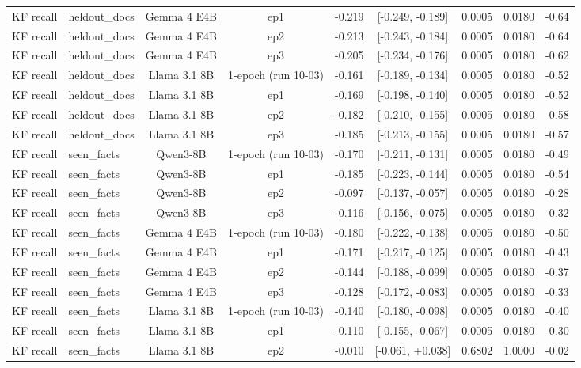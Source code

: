 \begin{table}[t]
{\begin{tabular}{llccccccc}
KF recall & heldout\_docs & Gemma 4 E4B & ep1 & -0.219 & [-0.249, -0.189] & 0.0005 & 0.0180 & -0.64 \\
KF recall & heldout\_docs & Gemma 4 E4B & ep2 & -0.213 & [-0.243, -0.184] & 0.0005 & 0.0180 & -0.64 \\
KF recall & heldout\_docs & Gemma 4 E4B & ep3 & -0.205 & [-0.234, -0.176] & 0.0005 & 0.0180 & -0.62 \\
KF recall & heldout\_docs & Llama 3.1 8B & 1-epoch (run 10-03) & -0.161 & [-0.189, -0.134] & 0.0005 & 0.0180 & -0.52 \\
KF recall & heldout\_docs & Llama 3.1 8B & ep1 & -0.169 & [-0.198, -0.140] & 0.0005 & 0.0180 & -0.52 \\
KF recall & heldout\_docs & Llama 3.1 8B & ep2 & -0.182 & [-0.210, -0.155] & 0.0005 & 0.0180 & -0.58 \\
KF recall & heldout\_docs & Llama 3.1 8B & ep3 & -0.185 & [-0.213, -0.155] & 0.0005 & 0.0180 & -0.57 \\
KF recall & seen\_facts & Qwen3-8B & 1-epoch (run 10-03) & -0.170 & [-0.211, -0.131] & 0.0005 & 0.0180 & -0.49 \\
KF recall & seen\_facts & Qwen3-8B & ep1 & -0.185 & [-0.223, -0.144] & 0.0005 & 0.0180 & -0.54 \\
KF recall & seen\_facts & Qwen3-8B & ep2 & -0.097 & [-0.137, -0.057] & 0.0005 & 0.0180 & -0.28 \\
KF recall & seen\_facts & Qwen3-8B & ep3 & -0.116 & [-0.156, -0.075] & 0.0005 & 0.0180 & -0.32 \\
KF recall & seen\_facts & Gemma 4 E4B & 1-epoch (run 10-03) & -0.180 & [-0.222, -0.138] & 0.0005 & 0.0180 & -0.50 \\
KF recall & seen\_facts & Gemma 4 E4B & ep1 & -0.171 & [-0.217, -0.125] & 0.0005 & 0.0180 & -0.43 \\
KF recall & seen\_facts & Gemma 4 E4B & ep2 & -0.144 & [-0.188, -0.099] & 0.0005 & 0.0180 & -0.37 \\
KF recall & seen\_facts & Gemma 4 E4B & ep3 & -0.128 & [-0.172, -0.083] & 0.0005 & 0.0180 & -0.33 \\
KF recall & seen\_facts & Llama 3.1 8B & 1-epoch (run 10-03) & -0.140 & [-0.180, -0.098] & 0.0005 & 0.0180 & -0.40 \\
KF recall & seen\_facts & Llama 3.1 8B & ep1 & -0.110 & [-0.155, -0.067] & 0.0005 & 0.0180 & -0.30 \\
KF recall & seen\_facts & Llama 3.1 8B & ep2 & -0.010 & [-0.061, +0.038] & 0.6802 & 1.0000 & -0.02 \\

\end{tabular}}
\end{table}
